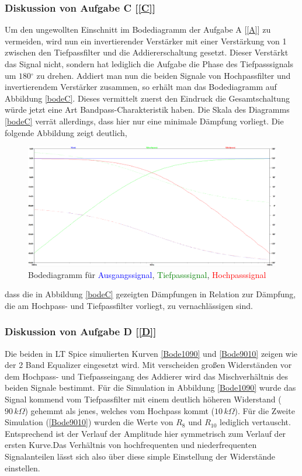 \subsubsection{Diskussion von Aufgabe C [\ref{C}]}
Um den ungewollten Einschnitt im Bodediagramm der Aufgabe A [\ref{A}] zu vermeiden, wird nun ein invertierender Verstärker mit einer Verstärkung von 1 zwischen den Tiefpassfilter und die Addiererschaltung gesetzt. Dieser Verstärkt das Signal nicht, sondern hat lediglich die Aufgabe die Phase des Tiefpasssignals um $\si{180}{^{\circ}}$ zu drehen. Addiert man nun die beiden Signale von Hochpassfilter und invertierendem Verstärker zusammen, so erhält man das Bodediagramm auf Abbildung \ref{bodeC}.
Dieses vermittelt zuerst den Eindruck die Gesamtschaltung würde jetzt eine Art Bandpass-Charakteristik haben. Die Skala des Diagramms \ref{bodeC} verrät allerdings, dass hier nur eine minimale Dämpfung vorliegt. Die folgende Abbildung zeigt deutlich,

\begin{figure}[h]
\centering
\includegraphics[width=13cm]{pics/Bode_vergleich}
\caption{Bodediagramm für \textcolor{blue}{Ausgangssignal}, \textcolor{green}{Tiefpasssignal}, \textcolor{red}{Hochpasssignal}}
\label{vergleich}
\end{figure}

dass die in Abbildung \ref{bodeC} gezeigten Dämpfungen in Relation zur Dämpfung, die am Hochpass- und Tiefpassfilter vorliegt, zu vernachlässigen sind.
\newpage
\subsubsection{Diskussion von Aufgabe D [\ref{D}]}
\label{DiskussionD}
Die beiden in LT Spice simulierten Kurven \ref{Bode1090} und \ref{Bode9010} zeigen wie der 2 Band Equalizer eingesetzt wird. Mit verscheiden großen Widerständen vor dem Hochpass- und Tiefpasseingang des Addierer wird das Mischverhältnis des beiden Signale bestimmt. Für die Simulation in Abbildung \ref{Bode1090} wurde das Signal kommend vom Tiefpassfilter mit einem deutlich höheren Widerstand ($\si{90}{\,k \Omega}$) gehemmt als jenes, welches vom Hochpass kommt ($\si{10}{\,k\Omega}$). Für die Zweite Simulation (\ref{Bode9010}) wurden die Werte von $R_{8}$ und $R_{10}$ lediglich vertauscht. Entsprechend ist der Verlauf der Amplitude hier symmetrisch zum Verlauf der ersten Kurve.\newline Das Verhältnis von hochfrequenten und niederfrequenten Signalanteilen lässt sich also über diese simple Einstellung der Widerstände einstellen.

